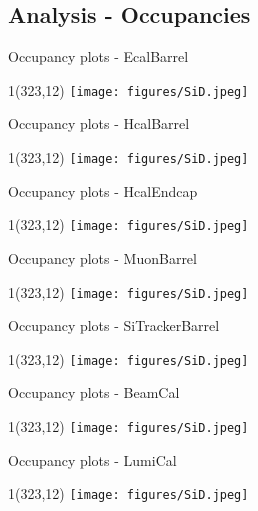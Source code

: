 \documentclass[xcolor={dvipsnames}]{beamer}
\newcommand{\sidlogo}{
  \setlength{\TPHorizModule}{1pt}
  \setlength{\TPVertModule}{1pt}
  \begin{textblock}{1}(323,12)
   \texttt{[image: figures/SiD.jpeg]}
  \end{textblock}
  }
\begin{document}
\subsection*{Analysis - Occupancies}
\begin{frame}{Occupancy plots - \small EcalBarrel}
\sidlogo
\end{frame}
\begin{frame}{Occupancy plots - \small HcalBarrel}
\sidlogo
\end{frame}
\begin{frame}{Occupancy plots - \small HcalEndcap}
\sidlogo
\end{frame}
\begin{frame}{Occupancy plots - \small MuonBarrel}
\sidlogo
\end{frame}
\begin{frame}{Occupancy plots - \small SiTrackerBarrel}
\sidlogo
\end{frame}
\begin{frame}{Occupancy plots - \small BeamCal}
\sidlogo
\end{frame}
\begin{frame}{Occupancy plots - \small LumiCal}
\sidlogo
\end{frame}
\end{document}
